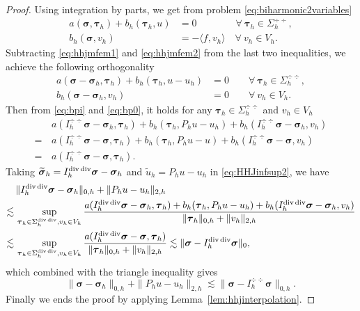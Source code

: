 \begin{proof}
Using integration by parts, we get from problem \eqref{eq:biharmonic2variables}
\begin{align*}
a(\boldsymbol\sigma, \boldsymbol\tau_h)+ b_h(\boldsymbol\tau_h, u) & =0 \quad\quad\quad\quad \forall~\boldsymbol\tau_h\in\Sigma_h^{\div\div}, \\
b_h(\boldsymbol\sigma, v_h) & =-\langle f, v_h\rangle  \quad \forall~v_h\in V_h.
\end{align*}
Subtracting \eqref{eq:hhjmfem1} and \eqref{eq:hhjmfem2} from the last two inequalities, we achieve the following orthogonality
\begin{align}
a(\boldsymbol\sigma-\boldsymbol\sigma_h, \boldsymbol\tau_h)+ b_h(\boldsymbol\tau_h, u-u_h) & =0 \quad\quad \forall~\boldsymbol\tau_h\in\Sigma_h^{\div\div}, \label{eq:temp20180502-1}\\
b_h(\boldsymbol\sigma-\boldsymbol\sigma_h, v_h) & =0  \quad\quad \forall~v_h\in V_h. \label{eq:temp20180502-2}
\end{align}
Then from \eqref{eq:bpi} and \eqref{eq:bp0}, it holds for any $\boldsymbol\tau_h\in\Sigma_h^{\div\div}$ and $v_h\in V_h$
\begin{align*}
&\,a(I_h^{\div\div}\boldsymbol\sigma-\boldsymbol\sigma_h, \boldsymbol\tau_h)+ b_h(\boldsymbol\tau_h, P_hu-u_h)+ b_h(I_h^{\div\div}\boldsymbol\sigma-\boldsymbol\sigma_h, v_h)  \\
=&\,a(I_h^{\div\div}\boldsymbol\sigma-\boldsymbol\sigma, \boldsymbol\tau_h)+ b_h(\boldsymbol\tau_h, P_hu-u)+ b_h(I_h^{\div\div}\boldsymbol\sigma-\boldsymbol\sigma, v_h) \\
=&\,a(I_h^{\div\div}\boldsymbol\sigma-\boldsymbol\sigma, \boldsymbol\tau_h).
\end{align*}
Taking $\widetilde{\boldsymbol\sigma}_h=I_h^{\operatorname{div}\operatorname{div}}\boldsymbol{\sigma}-\boldsymbol{\sigma}_h$ and $\widetilde{u}_h=P_hu-u_h$ in \eqref{eq:HHJinfsup2},
we have
\begin{align*}
&\,\|I_h^{\operatorname{div}\operatorname{div}}\boldsymbol{\sigma}-\boldsymbol{\sigma}_h\|_{0,h}+\|P_hu-u_h\|_{2,h}\\
\lesssim&\, \sup_{\boldsymbol\tau_h\in\Sigma_h^{\operatorname{div}\operatorname{div}}, v_h\in V_h}\frac{a(I_h^{\operatorname{div}\operatorname{div}}\boldsymbol\sigma-\boldsymbol\sigma_h, \boldsymbol\tau_h)+ b_h(\boldsymbol\tau_h, P_hu-u_h)+ b_h(I_h^{\operatorname{div}\operatorname{div}}\boldsymbol\sigma-\boldsymbol\sigma_h, v_h)}{\|\boldsymbol\tau_h\|_{0,h}+\|v_h\|_{2,h}} \\
\lesssim &\,\sup_{\boldsymbol\tau_h\in\Sigma_h^{\operatorname{div}\operatorname{div}}, v_h\in V_h}\frac{a(I_h^{\operatorname{div}\operatorname{div}}\boldsymbol\sigma-\boldsymbol\sigma, \boldsymbol\tau_h)}{\|\boldsymbol\tau_h\|_{0,h}+\|v_h\|_{2,h}}\lesssim \|\boldsymbol\sigma-I_h^{\operatorname{div}\operatorname{div}}\boldsymbol\sigma\|_0,
\end{align*}
which combined with the triangle inequality gives
\[
\|\boldsymbol{\sigma}-\boldsymbol{\sigma}_h\|_{0,h}+\|P_hu-u_h\|_{2,h}\lesssim \|\boldsymbol\sigma-I_h^{\div\div}\boldsymbol\sigma\|_{0,h}.
\]
Finally we ends the proof by applying Lemma~\ref{lem:hhjinterpolation}.
\end{proof}


